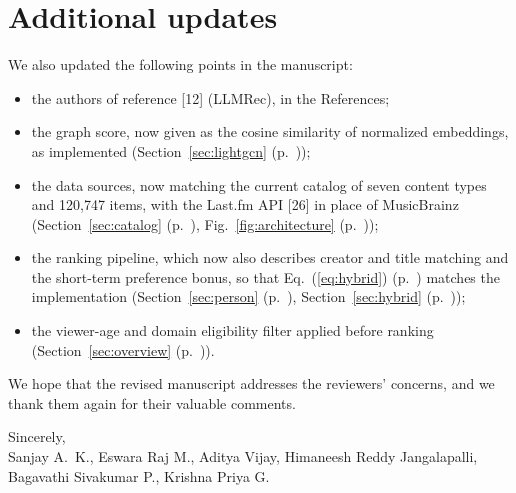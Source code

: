 \documentclass[10pt]{article}
\newcounter{rc}
\newcommand{\sect}[1]{Section~\ref{#1} (p.~\pageref{#1})}
\newcommand{\figr}[1]{Fig.~\ref{#1} (p.~\pageref{#1})}
\newcommand{\eqn}[1]{Eq.~(\ref{#1}) (p.~\pageref{#1})}
\begin{document}
\section*{Additional updates}
We also updated the following points in the manuscript:
\begin{itemize}
  \item the authors of reference [12] (LLMRec), in the References;
  \item the graph score, now given as the cosine similarity of normalized embeddings, as implemented (\sect{sec:lightgcn});
  \item the data sources, now matching the current catalog of seven content types and 120,747 items, with the Last.fm API [26] in place of MusicBrainz (\sect{sec:catalog}, \figr{fig:architecture});
  \item the ranking pipeline, which now also describes creator and title matching and the short-term preference bonus, so that \eqn{eq:hybrid} matches the implementation (\sect{sec:person}, \sect{sec:hybrid});
  \item the viewer-age and domain eligibility filter applied before ranking (\sect{sec:overview}).
\end{itemize}

We hope that the revised manuscript addresses the reviewers' concerns, and we thank them again for their valuable comments.

\medskip
Sincerely,\\
Sanjay A.~K., Eswara Raj M., Aditya Vijay, Himaneesh Reddy Jangalapalli, Bagavathi Sivakumar P., Krishna Priya G.
\end{document}
